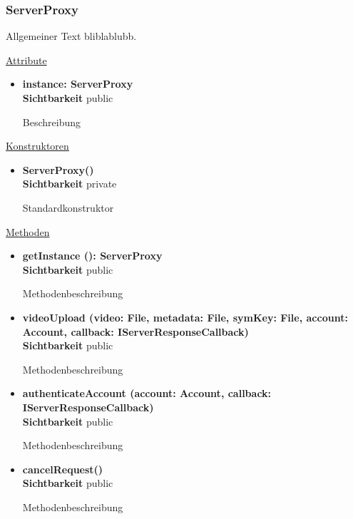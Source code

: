 \subsubsection{ServerProxy} \label{app:klasse:ServerProxy}
Allgemeiner Text bliblablubb. \newline

\underline{Attribute}
\begin{itemize}
\itemsep0pt
\item \textbf{instance: ServerProxy} \hfill\\ 
\textbf{Sichtbarkeit} public

Beschreibung

\end{itemize}

\underline{Konstruktoren}
\begin{itemize}
\itemsep0pt
\item \textbf{ServerProxy()} \hfill\\
\textbf{Sichtbarkeit} private

Standardkonstruktor
\end{itemize}

\underline{Methoden}
\begin{itemize}
\itemsep0pt

\item \textbf{getInstance (): ServerProxy}\hfill\\
\textbf{Sichtbarkeit} public

Methodenbeschreibung

\item \textbf{videoUpload (video: File, metadata: File, symKey: File, account: Account, callback: IServerResponseCallback)}\hfill\\
\textbf{Sichtbarkeit} public

Methodenbeschreibung

\item \textbf{authenticateAccount (account: Account, callback: IServerResponseCallback)}\hfill\\
\textbf{Sichtbarkeit} public

Methodenbeschreibung

\item \textbf{cancelRequest()}\hfill\\
\textbf{Sichtbarkeit} public

Methodenbeschreibung

\end{itemize}